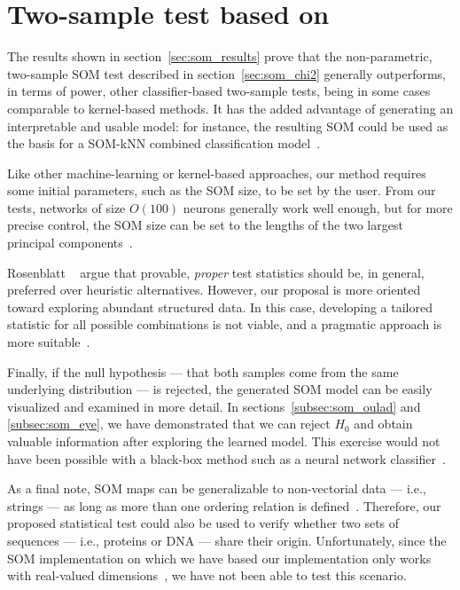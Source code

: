 \section{Two-sample test based on }
\label{sec:discuss_som}
The results shown in section~\ref{sec:som_results} prove that the non-parametric,
two-sample \gls{SOM} test described in section~\ref{sec:som_chi2} generally outperforms,
in terms of power, other classifier-based two-sample tests, being in some cases
comparable to kernel-based methods. It has the added advantage of generating an
interpretable and usable model: for instance, the resulting \gls{SOM} could be used
as the basis for a \gls{SOM}-\gls{kNN} combined classification model~\cite{silva2011som}.

Like other machine-learning or kernel-based approaches, our method requires some
initial parameters, such as the \gls{SOM} size, to be set by the user. From our
tests, networks of size $O(100)$ neurons generally work well enough, but for more
precise control, the \gls{SOM} size can be set to the lengths of the two largest
principal components~\cite{KOHONEN201352}.

Rosenblatt \etal~\cite{rosenblatt2019better} argue that provable, \emph{proper} test statistics
should be, in general, preferred over heuristic alternatives. However, our
proposal is more oriented toward exploring abundant structured data. In this
case, developing a tailored statistic for all possible combinations is not viable,
and a pragmatic approach is more suitable~\cite{kim2021classification}.

Finally, if the null hypothesis --- that both samples come from the same underlying
distribution --- is rejected, the generated \gls{SOM}  model can be easily visualized
and examined in more detail.
In sections~\ref{subsec:som_oulad} and \ref{subsec:som_eye}, we have demonstrated
that we can reject $H_0$ and obtain valuable information after exploring the learned model.
This exercise would not have been possible with a black-box method such as
a neural network classifier~\cite{friedman2004multivariate}.

As a final note, \gls{SOM} maps can be generalizable to non-vectorial data
--- i.e., strings --- as long as more than one ordering relation is
defined~\cite{kohonen1982self, KOHONEN201352}.
Therefore, our proposed statistical test could also be used to verify whether
two sets of sequences --- i.e., proteins or DNA --- share their origin.
Unfortunately, since the \gls{SOM} implementation on which we have based our implementation
only works with real-valued dimensions~\cite{wittek_somoclu_2017}, we have not been
able to test this scenario.


